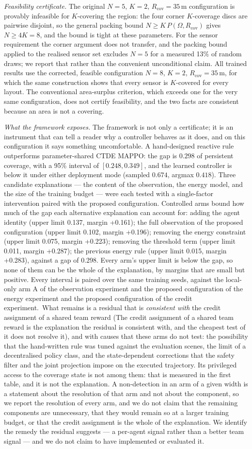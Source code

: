 \documentclass[conference]{IEEEtran}
\newcommand{\tokArgCk}{0.418}
\newcommand{\tokArmsSummarySentence}{Controlled arms bound how much of the gap each alternative explanation can account for: adding the agent identity (upper limit 0.137, margin +0.161); the full observation of the proposed configuration (upper limit 0.102, margin +0.196); removing the energy constraint (upper limit 0.075, margin +0.223); removing the threshold term (upper limit 0.011, margin +0.287); the previous energy rule (upper limit 0.015, margin +0.283), against a gap of 0.298.  Every arm's upper limit is below the gap, so none of them can be the whole of the explanation, by margins that are small but positive.  Every interval is paired over the same training seeds, against the local-only arm A of the observation experiment and the proposed configuration of the energy experiment and the proposed configuration of the credit experiment.}
\newcommand{\tokCreditResidualShort}{The credit assignment of a shared team reward is the explanation the residual is consistent with, and the cheapest test of it does not resolve it}
\newcommand{\tokGap}{0.298}
\newcommand{\tokGapCi}{[0.248, 0.349]}
\newcommand{\tokMappoCk}{0.674}
\begin{document}
\emph{Feasibility certificate.} The original $N=5$, $K=2$, $R_{\mathrm{cov}}=35$\,m configuration is provably infeasible for $K$-covering the region: the four corner $K$-coverage discs are pairwise disjoint, so the general packing bound $N\ge K\,P(\Omega,R_{\mathrm{cov}})$ gives $N\ge 4K=8$, and the bound is tight at these parameters. For the sensor requirement the corner argument does not transfer, and the packing bound applied to the realised sensor set excludes $N=5$ for a measured 13\% of random draws; we report that rather than the convenient unconditional claim. All trained results use the corrected, feasible configuration $N=8$, $K=2$, $R_{\mathrm{cov}}=35$\,m, for which the same construction shows that every sensor is $K$-covered for every layout. The conventional area-surplus criterion, which exceeds one for the very same configuration, does not certify feasibility, and the two facts are consistent because an area is not a covering.

\emph{What the framework exposes.} The framework is not only a certificate; it is an instrument that can tell a reader why a controller behaves as it does, and on this configuration it says something uncomfortable. A hand-designed reactive rule outperforms parameter-shared CTDE MAPPO: the gap is $\tokGap$ of persistent coverage, with a 95\% interval of $\tokGapCi$, and the learned controller is below it under either deployment mode (sampled $\tokMappoCk$, argmax $\tokArgCk$). Three candidate explanations --- the content of the observation, the energy model, and the size of the training budget --- were each tested with a single-factor intervention paired with the proposed configuration.  \tokArmsSummarySentence\ What remains is a residual that is \emph{consistent with} the credit assignment of a shared team reward (\tokCreditResidualShort), and with causes that these arms do not test: the possibility that the hand-written rule was tuned against the evaluation scenes, the limit of a decentralised policy class, and the state-dependent corrections that the safety filter and the joint projection impose on the executed trajectory.  Its privileged access to the coverage state is not among them: that is measured in the first table, and it is not the explanation. A non-detection in an arm of a given width is a statement about the resolution of that arm and not about the component, so we report the resolution of every arm, and we do not claim that the remaining components are unnecessary, that they would remain so at a larger training budget, or that the credit assignment is the whole of the explanation. We identify the remedy the residual suggests --- a per-agent signal rather than a better team signal --- and we do not claim to have implemented or evaluated it.
\end{document}

